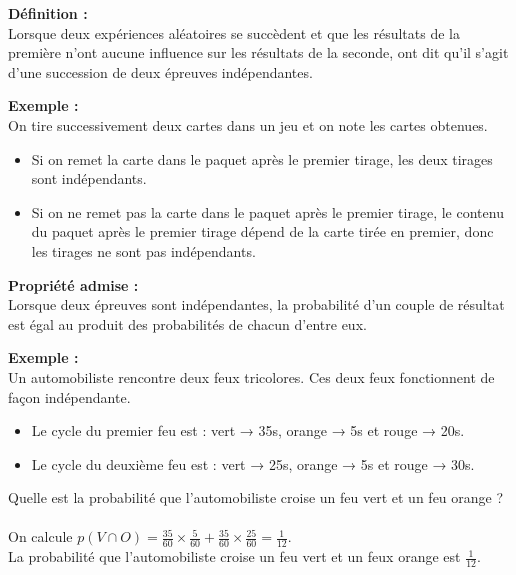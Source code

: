 \documentclass[11pt,a4paper]{article}
\begin{document}
\begin{mdframed}[style=definitionStyle]
  \textbf{Définition :} ~\\
  Lorsque deux expériences aléatoires se succèdent et que les résultats de la première n'ont aucune influence sur les résultats de la seconde, ont dit qu'il s'agit d'une succession de deux épreuves indépendantes.
\end{mdframed}

\textbf{Exemple :} ~\\
On tire successivement deux cartes dans un jeu et on note les cartes obtenues.
\begin{itemize}
  \item Si on remet la carte dans le paquet après le premier tirage, les deux tirages sont indépendants.
  \item Si on ne remet pas la carte dans le paquet après le premier tirage, le contenu du paquet après le premier tirage dépend de la carte tirée en premier, donc les tirages ne sont pas indépendants.
\end{itemize}

\newpage

\begin{mdframed}[style=proprieteStyle]
  \textbf{Propriété admise :} ~\\
  Lorsque deux épreuves sont indépendantes, la probabilité d'un couple de résultat est égal au produit des probabilités de chacun d'entre eux.
\end{mdframed}

\textbf{Exemple :} ~\\
Un automobiliste rencontre deux feux tricolores. Ces deux feux fonctionnent de façon indépendante.
\begin{itemize}
  \item Le cycle du premier feu est : vert → 35s, orange → 5s et rouge → 20s.
  \item Le cycle du deuxième feu est : vert → 25s, orange → 5s et rouge → 30s.
\end{itemize}
Quelle est la probabilité que l'automobiliste croise un feu vert et un feu orange ? ~\\

On calcule $p(V\cap O)=\frac{35}{60}\times\frac{5}{60}+\frac{35}{60}\times\frac{25}{60}=\frac{1}{12}$.\\
La probabilité que l'automobiliste croise un feu vert et un feux orange est $\frac{1}{12}$.
\end{document}

